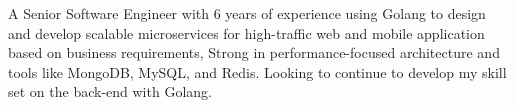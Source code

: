 


\begin{cvparagraph}


A Senior Software Engineer with 6 years of experience using Golang to design and develop scalable microservices for high-traffic web and mobile application based on business requirements, Strong in performance-focused architecture and tools like MongoDB, MySQL, and Redis. Looking to continue to develop my skill set on the back-end with Golang.

\end{cvparagraph}
